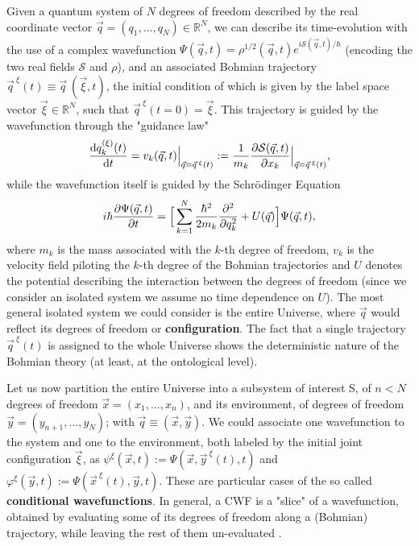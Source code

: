 \documentclass[11pt, a4paper]{article} %
\newcommand{\R}{\mathbb{R}} %
\begin{document}
Given a quantum system of $N$ degrees of freedom described by the real coordinate vector $\vec{q}=(q_1,..., q_N)\in\R^N$, we can describe its time-evolution with the use of a complex wavefunction $\Psi(\vec{q},t)=\rho^{1/2}(\vec{q},t)e^{i\mathcal{S}(\vec{q},t)/\hbar}$ (encoding the two real fields $\mathcal{S}$ and $\rho$), and an associated Bohmian trajectory $\vec{q}^{\:\xi}(t)\equiv \vec{q}\:(\vec{\xi},t)$, the initial condition of which is given by the label space vector $\vec{\xi}\in\R^N$, such that $\vec{q}^{\:\xi}(t=0)=\vec{\xi}$. This trajectory is guided by the wavefunction through the "guidance law"\vspace{-0.1cm}
\begin{equation}\label{GL}
\dv{q_k^{ (\xi)}(t)}{t} = v_k(\vec{q},t)\Big\rvert_{\vec{q}=\vec{q}^{\:\xi}(t)}:=\frac{1}{m_k} \pdv{\mathcal{S}(\vec{q},t)}{x_k}\Big\rvert_{\vec{q}=\vec{q}^{\:\xi}(t)},
\end{equation}
while the wavefunction itself is guided by the Schrödinger Equation\vspace{-0.1cm} \cite{Bohm,Holland,Durr,JordiXavier}
\begin{equation}\label{SE}
i\hbar\pdv{\Psi(\vec{q},t)}{t}=\Big[ \sum_{k=1}^N \frac{\hbar^2}{2m_k}\pdv[2]{}{q_k}+U(\vec{q})\Big]\Psi(\vec{q},t),\vspace{-0.1cm}
\end{equation}
where $m_k$ is the mass associated with the $k$-th degree of freedom, $v_k$ is the velocity field piloting the $k$-th degree of the Bohmian trajectories and $U$ denotes the potential describing the interaction between the degrees of freedom (since we consider an isolated system we assume no time dependence on $U$). The most general isolated system we could consider is the entire Universe, where $\vec{q}$ would reflect its degrees of freedom or {\bf configuration}. The fact that a single trajectory $\vec{q}^{\:\xi}(t)$ is assigned to the whole Universe shows the deterministic nature of the Bohmian theory (at least, at the ontological level). 

Let us now partition the entire Universe into a subsystem of interest S, of $n<N$ degrees of freedom $\vec{x}=(x_1,...,x_n)$, and its environment, of degrees of freedom $\vec{y}=(y_{n+1},...,y_N)$; with $\vec{q}\equiv (\vec{x},\vec{y})$. We could associate one wavefunction to the system and one to the environment, both labeled by the initial joint configuration $\vec{\xi}$, as $\psi^\xi(\vec{x},t):=\Psi(\vec{x},\vec{y}^{\:\xi}(t),t)$ and $\varphi^\xi(\vec{y},t):=\Psi(\vec{x}^{\:\xi}(t),\vec{y},t)$. These are particular cases of the so called {\bf conditional wavefunctions}. In general, a CWF is a "slice" of a wavefunction, obtained by evaluating some of its degrees of freedom along a (Bohmian) trajectory, while leaving the rest of them un-evaluated \cite{Absolute, JordiXavier}. 
\end{document}
